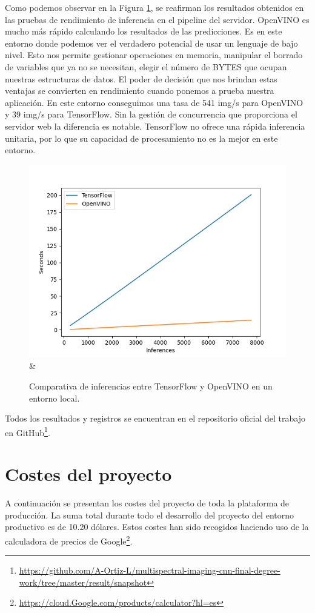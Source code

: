 Como podemos observar en la Figura \ref{fig:TensorFlow VS OpenVINO}, se reafirman los resultados obtenidos en las pruebas de rendimiento de inferencia en el pipeline del servidor. OpenVINO es mucho más rápido calculando los resultados de las predicciones. Es en este entorno donde podemos ver el verdadero potencial de usar un lenguaje de bajo nivel. Esto nos permite gestionar operaciones en memoria, manipular el borrado de variables que ya no se necesitan, elegir el número de BYTES que ocupan nuestras estructuras de datos.
El poder de decisión que nos brindan estas ventajas se convierten en rendimiento cuando ponemos a prueba nuestra aplicación.
En este entorno conseguimos una tasa de 541 img/s para OpenVINO y 39 img/s para TensorFlow. Sin la gestión de concurrencia que proporciona el servidor web la diferencia es notable. TensorFlow no ofrece una rápida inferencia unitaria, por lo que su capacidad de procesamiento no es la mejor en este entorno.

\begin{figure}[H]
    \centering
        \includegraphics[height=0.5\textwidth]{images/chapter5/local_inferences.png} &
    \caption{Comparativa de inferencias entre TensorFlow y OpenVINO en un entorno local.}   \label{fig:TensorFlow VS OpenVINO}
\end{figure}

Todos los resultados y registros se encuentran en el repositorio oficial del trabajo en GitHub\footnote{\url{https://github.com/A-Ortiz-L/multispectral-imaging-cnn-final-degree-work/tree/master/result/snapshot}}.

\section{Costes del proyecto}\label{sec:costes-del-proyecto}
A continuación se presentan los costes del proyecto de toda la plataforma de producción.
La suma total durante todo el desarrollo del proyecto del entorno productivo es de 10.20 dólares.
Estos costes han sido recogidos haciendo uso de la calculadora de precios de Google\footnote{\url{https://cloud.Google.com/products/calculator?hl=es}}.

